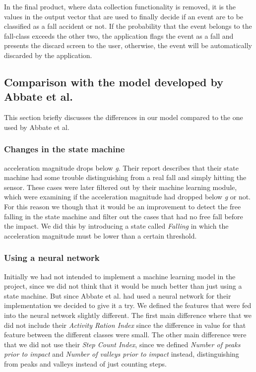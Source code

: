 \documentclass[12pt, a4paper, onecolumn]{article}
\begin{document}
	In the final product, where data collection functionality is removed, it is the values in the output vector that are used to finally decide if an event are to be classified as a fall accident or not. If the probability that the event belongs to the fall-class exceeds the other two, the application flags the event as a fall and presents the discard screen to the user, otherwise, the event will be automatically discarded by the application. 
	
	
	\subsection{Comparison with the model developed by Abbate et al.}
	
	This section briefly discusses the differences in our model compared to the one used by Abbate et al.
	
	\subsubsection{Changes in the state machine}
	
acceleration magnitude drops below \textit{g}. Their report describes that their state machine had some trouble distinguishing from a real fall and simply hitting the sensor. These cases were later filtered out by their machine learning module, which were examining if the acceleration magnitude had dropped below \textit{g} or not. For this reason we though that it would be an improvement to detect the free falling in the state machine and filter out the cases that had no free fall before the impact. We did this by introducing a state called \textit{Falling} in which the acceleration magnitude must be lower than a certain threshold.
	
	\subsubsection{Using a neural network}
	
	Initially we had not intended to implement a machine learning model in the project, since we did not think that it would be much better than just using a state machine. But since Abbate et al. had used a neural network for their implementation we decided to give it a try. We defined the features that were fed into the neural network slightly different. The first main difference where that we did not include their \textit{Activity Ration Index} since the difference in value for that feature between the different classes were small. The other main difference were that we did not use their \textit{Step Count Index}, since we defined \textit{Number of peaks prior to impact} and \textit{Number of valleys prior to impact} instead, distinguishing from peaks and valleys instead of just counting steps. 
	
\end{document}
